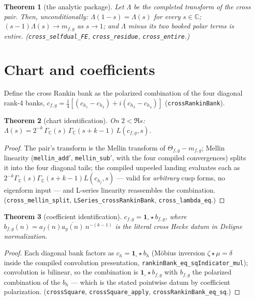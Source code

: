 \documentclass[11pt]{article}
\newtheorem{theorem}{Theorem}
\newcommand{\Gm}{\Gamma_{\mathbb C}}
\begin{document}
\begin{theorem}[the analytic package]\label{thm:pkg}
Let $\Lambda$ be the completed transform of the cross pair.  Then, unconditionally:
$\Lambda(1-s)=\Lambda(s)$ for every $s\in\mathbb C$; $(s-1)\Lambda(s)\to m_{f,g}$ as
$s\to1$; and $\Lambda$ minus its two booked polar terms is entire.
(\texttt{cross\_selfdual\_FE}, \texttt{cross\_residue}, \texttt{cross\_entire}.)
\end{theorem}

\section{Chart and coefficients}

Define the cross Rankin bank as the polarized combination of the four diagonal rank-4
banks, $c_{f,g}=\tfrac14[(c_{h_1}-c_{h_2})+i(c_{h_3}-c_{h_4})]$
(\texttt{crossRankinBank}).

\begin{theorem}[chart identification]\label{thm:chart}
On $2<\Re s$:
$\Lambda(s)=2^{-k}\,\Gm(s)\,\Gm(s+k-1)\,L(c_{f,g},s)$.
\end{theorem}
\begin{proof}
The pair's transform is the Mellin transform of $\Theta_{f,g}-m_{f,g}$; Mellin linearity
(\texttt{mellin\_add$'$}, \texttt{mellin\_sub$'$}, with the four compiled convergences)
splits it into the four diagonal tails; the compiled unpeeled landing evaluates each as
$2^{-k}\Gm(s)\Gm(s+k-1)L(c_{h_j},s)$ --- valid for \emph{arbitrary} cusp forms, no
eigenform input --- and L-series linearity reassembles the combination.
(\texttt{cross\_mellin\_split}, \texttt{LSeries\_crossRankinBank},
\texttt{cross\_lambda\_eq}.)
\end{proof}

\begin{theorem}[coefficient identification]\label{thm:coeff}
$c_{f,g}=\mathbf 1_{\square}\star b_{f,g}$, where
$b_{f,g}(n)=a_f(n)\overline{a_g(n)}\,n^{-(k-1)}$ is the literal cross Hecke datum in
Deligne normalization.
\end{theorem}
\begin{proof}
Each diagonal bank factors as $c_h=\mathbf 1_{\square}\star b_h$ (Möbius inversion
$\zeta\star\mu=\delta$ inside the compiled convolution presentation,
\texttt{rankinBank\_eq\_sqIndicator\_mul}); convolution is bilinear, so the combination
is $\mathbf 1_{\square}\star b_{f,g}$ with $b_{f,g}$ the polarized combination of the
$b_h$ --- which is the stated pointwise datum by coefficient polarization.
(\texttt{crossSquare}, \texttt{crossSquare\_apply}, \texttt{crossRankinBank\_eq\_sq}.)
\end{proof}
\end{document}
